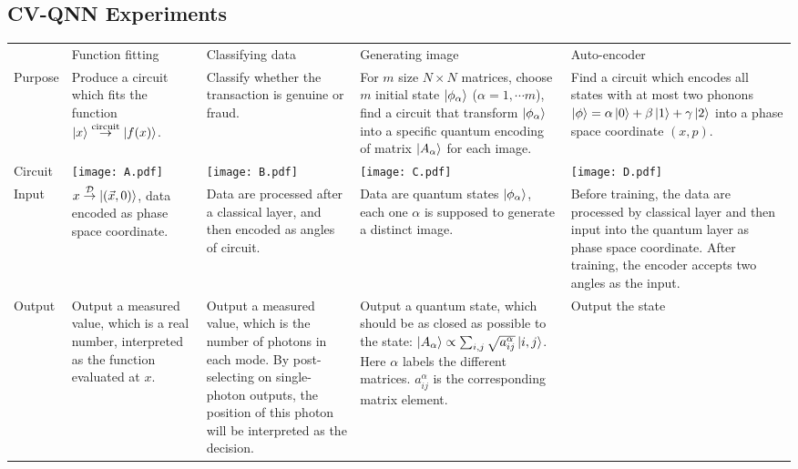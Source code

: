 \documentclass{article}
\begin{document}
\subsection{ CV-QNN Experiments}

\begin{table}[H]
  \centering
  \extrarowsep=1.5mm
  \begin{tabu}{X[0.5]|X|X|X|X}
    & Function fitting & Classifying data & Generating image & Auto-encoder 
    \\
    Purpose &
    Produce a circuit which fits the function
    $\ket{x} \overset{\text{circuit}}{\to} \ket{f(x)}$.&
    Classify whether the transaction is genuine or fraud. &
    For $m$ size $N\times N$ matrices, choose $m$ initial state $\ket{\phi_\alpha}$
    ($\alpha = 1,\cdots m$), find a circuit that transform $\ket{\phi_\alpha}$
    into a specific quantum encoding of matrix $\ket{A_\alpha}$ for each
    image. &
    Find a circuit which encodes all states with at most two phonons
    $\ket{\phi}=\alpha\ket{0} + \beta\ket{1} +\gamma\ket{2}$ into a phase space
    coordinate $(x,p)$.
    \\
    Circuit &
    \texttt{[image: A.pdf]} &
    \texttt{[image: B.pdf]} &
    \texttt{[image: C.pdf]} &
    \texttt{[image: D.pdf]} 
    \\
    Input &
    $x \overset{\mathcal{D}}{\to} \ket{(\vec{x},0)}$, data encoded as
    phase space coordinate.&
    Data are processed after a classical layer, and then encoded as angles of circuit.&
    Data are quantum states $\ket{\phi_\alpha}$, each one $\alpha$ is supposed
    to generate a distinct image.&
    Before training, the data are processed by classical layer and then input
    into the quantum layer as phase space coordinate. After training, the encoder accepts two angles as
    the input.
    \\
    Output &
    Output a measured value, which is a real number, interpreted as the function evaluated at $x$. &
    Output a measured value, which is the number of photons in each mode. By
    post-selecting on single-photon outputs, the position of this photon will be
    interpreted as the decision.&
    Output a quantum state, which should be as closed as possible to the state:
    $\ket{A_\alpha} \propto \sum_{i,j} \sqrt{a_{ij}^\alpha} \ket{i,j} $. Here
    $\alpha$ labels the different matrices. $a_{ij}^\alpha$ is the corresponding
    matrix element.
    &
    Output the state 


\end{tabu}
\end{table}
\end{document}
